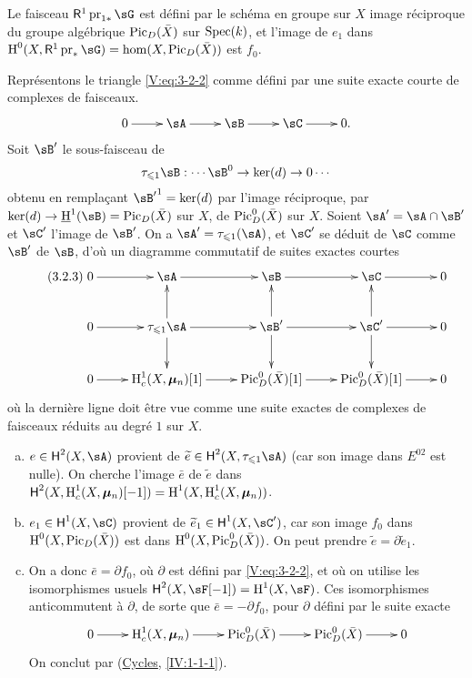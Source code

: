 Le faisceau $\R^1\operatorname{pr}_{1\ast}\sG$ est défini par le schéma en 
groupe sur $X$ image réciproque du groupe algébrique $\operatorname{Pic}_D(\bar X)$ sur 
$\operatorname{Spec}(k)$, et l'image de $e_1$ dans 
$\h^0(X,\R^1\operatorname{pr}_\ast\sG) = \hom(X,\pic_D(\bar X))$ est $f_0$. 

Représentons le triangle \eqref{V:eq:3-2-2} comme défini par une suite 
exacte courte de complexes de faisceaux.
\[\xymatrix{
  0 \ar[r] 
    & \sA \ar[r] 
    & \sB \ar[r] 
    & \sC \ar[r] 
    & 0 \text{.}
}\]
Soit $\sB'$ le sous-faisceau de 
\[
  \tau_{\leqslant 1} \sB : \cdots \sB^0 \to \ker(d) \to 0 \cdots
\]
obtenu en remplaçant ${\sB'}^1=\ker(d)$ par l'image réciproque, par 
$\ker(d)\to \underline\h^1(\sB) = \pic_D(\bar X)$ sur $X$, de 
$\operatorname{Pic}_D^0(\bar X)$ sur $X$. Soient $\sA'=\sA\cap \sB'$ et $\sC'$ l'image de 
$\sB'$. On a $\sA'=\tau_{\leqslant 1}(\sA)$, et $\sC'$ se déduit de $\sC$ 
comme $\sB'$ de $\sB$, d'où un diagramme commutatif de suites exactes courtes 
\begin{equation*}\tag{3.2.3}\label{V:eq:3-2-3}
\xymatrix{
  0 \ar[r] 
    & \sA \ar[r] 
    & \sB \ar[r] 
    & \sC \ar[r] 
    & 0 \\
  0 \ar[r] 
    & \tau_{\leqslant 1} \sA \ar[r] \ar[u] \ar[d] 
    & \sB' \ar[r] \ar[u] \ar[d] 
    & \sC' \ar[r] \ar[u] \ar[d] 
    & 0 \\
  0 \ar[r] 
    & \h_c^1(X,\dmu_n)[1] \ar[r] 
    & \pic_D^0(\bar X)[1] \ar[r] 
    & \pic_D^0(\bar X)[1] \ar[r] 
    & 0
}
\end{equation*}
où la dernière ligne doit être vue comme une suite exactes de complexes 
de faisceaux réduits au degré $1$ sur $X$. 
\begin{enumerate}[a)]
  \item $e\in \hh^2(X,\sA)$ provient de 
    $\widetilde e\in \hh^2(X,\tau_{\leqslant 1}\sA)$ (car son image dans 
    $E^{02}$ est nulle). On cherche l'image $\bar e$ de $\widetilde e$ dans 
    $\operatorname{\mathsf{H}}^2(X,\operatorname{H}_c^1(X,{\bm\mu}_n)[-1]) = \operatorname{H}^1(X,\operatorname{H}_c^1(X,{\bm\mu}_n))$.
  \item $e_1\in \hh^1(X,\sC)$ provient de $\widetilde e_1\in \hh^1(X,\sC')$, 
    car son image $f_0$ dans $\operatorname{H}^0(X,\operatorname{Pic}_D(\bar X))$ est dans 
    $\operatorname{H}^0(X,\operatorname{Pic}_D^0(\bar X))$. On peut prendre 
    $\widetilde e=\partial \widetilde e_1$. 
  \item On a donc $\bar e = \partial f_0$, où $\partial $ est défini par 
    \eqref{V:eq:3-2-2}, et où on utilise les isomorphismes usuels 
    $\hh^2(X,\sF[-1]) = \h^1(X,\sF)$. Ces isomorphismes anticommutent à 
    $\partial$, de sorte que $\bar e=-\partial f_0$, pour $\partial$ défini 
    par le suite exacte 
    \[\xymatrix{
      0 \ar[r] 
        & \h_c^1(X,\dmu_n) \ar[r] 
        & \pic_D^0(\bar X) \ar[r] 
        & \pic_D^0(\bar X) \ar[r] 
        & 0 
    }\]
    On conclut par (\hyperref[IV]{Cycles}, \ref{IV:1-1-1}). 
\end{enumerate}





